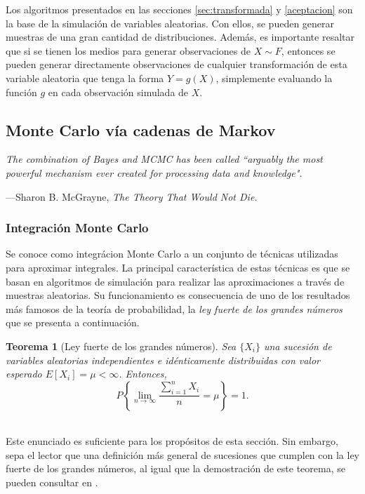 \documentclass[11pt,a4paper]{article}
\newtheorem{theorem}{Teorema}[section]
\begin{document}
Los algoritmos presentados en las secciones \ref{sec:transformada} y \ref{aceptacion} son la base de la simulación de variables aleatorias. Con ellos, se pueden generar muestras de una gran cantidad de distribuciones. Además, es importante resaltar que si se tienen los medios para generar observaciones de $X \sim F$, entonces se pueden generar directamente observaciones de cualquier transformación de esta variable aleatoria que tenga la forma $Y = g(X)$, simplemente evaluando la función $g$ en cada observación simulada de $X$.\\

\subsection{Monte Carlo vía cadenas de Markov}	
\label{sec_cadenas}
\epigraph{\itshape The combination of Bayes and MCMC has been called ``arguably the most powerful mechanism ever created for processing data and knowledge".}{---Sharon B. McGrayne, \textit{The Theory That Would Not Die.}}
\subsubsection*{Integración Monte Carlo}

Se conoce como integrácion Monte Carlo a un conjunto de técnicas utilizadas para aproximar integrales. La principal característica de estas técnicas es que se basan en algoritmos de simulación para realizar las aproximaciones a través de muestras aleatorias. Su funcionamiento es consecuencia de uno de los resultados más famosos de la teoría de probabilidad, la \textit{ley fuerte de los grandes números} que se presenta a continuación.\\

\begin{theorem}[Ley fuerte de los grandes números]
\label{grandes_numeros}
Sea $\lbrace X_i \rbrace$ una sucesión de variables aleatorias independientes e idénticamente distribuidas con valor esperado $E[X_i]=\mu < \infty$. Entonces,
$$P\left\lbrace \lim_{n \to \infty} \frac{\sum_{i=1}^{n} X_i}{n} = \mu \right\rbrace = 1.$$\\
\end{theorem}

Este enunciado es suficiente para los propósitos de esta sección. Sin embargo, sepa el lector que una definición más general de sucesiones que cumplen con la ley fuerte de los grandes números, al igual que la demostración de este teorema, se pueden consultar en \citet{feller}.\\
\end{document}

